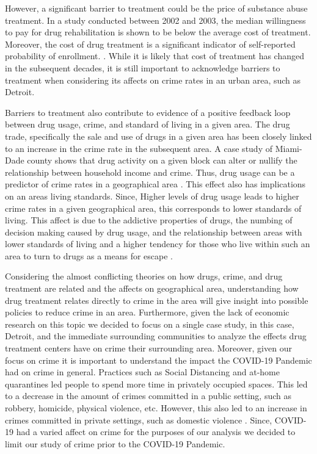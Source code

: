 \documentclass[12pt]{article}
\begin{document}
However, a significant barrier to treatment could be the price of substance abuse treatment. In a study conducted between 2002 and 2003, the median willingness to pay for drug rehabilitation is shown to be below the average cost of treatment. Moreover, the cost of drug treatment is a significant indicator of self-reported probability of enrollment. \cite{cost_of_drug_treatment}. While it is likely that cost of treatment has changed in the subsequent decades, it is still important to acknowledge barriers to treatment when considering its affects on crime rates in an urban area, such as Detroit. 

Barriers to  treatment also contribute to evidence of a positive feedback loop between drug usage, crime, and standard of living in a given area. The drug trade, specifically the sale and use of drugs in a given area has been closely linked to an increase in the crime rate in the subsequent area. A case study of Miami-Dade county shows that drug activity on a given block can alter or nullify the relationship between household income and crime. Thus, drug usage can be a predictor of crime rates in a geographical area \cite{drugs_crime_space_time}. This effect also has implications on an areas living standards. Since, Higher levels of drug usage leads to higher crime rates in a given geographical area, this corresponds to lower standards of living. This affect is due to the addictive properties of drugs, the numbing of decision making caused by drug usage, and the relationship between areas with lower standards of living and a higher tendency for those who live within such an area to turn to drugs as a means for escape \cite{drugs_and_crime}.

Considering the almost conflicting theories on how drugs, crime, and drug treatment are related and the affects on geographical area, understanding how drug treatment relates directly to crime in the area will give insight into possible policies to reduce crime in an area. Furthermore, given the lack of economic research on this topic we decided to focus on a single case study, in this case, Detroit, and the immediate surrounding communities to analyze the effects drug treatment centers have on crime their surrounding area. Moreover, given our focus on crime it is important to understand the impact the COVID-19 Pandemic had on crime in general. Practices such as Social Distancing and at-home quarantines led people to spend more time in privately occupied spaces. This led to a decrease in the amount of crimes committed in a public setting, such as robbery, homicide, physical violence, etc. However, this also led to an increase in crimes committed in private settings, such as domestic violence \cite{covid_and_crime}. Since, COVID-19 had a varied affect on crime for the purposes of our analysis we decided to limit our study of crime prior to the COVID-19 Pandemic.
\end{document}

